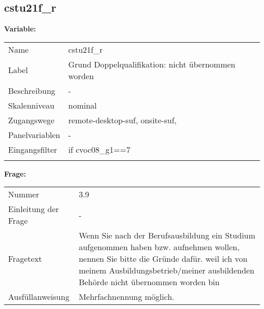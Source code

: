 	
	
	\subsection{cstu21f\_r}
	\label{subSection:cstu21f_r}

	\noindent\textbf{Variable:}\\
		\begin{tabular}{lL{11.3cm}}
			\label{tableVariable:cstu21f_r}
			Name & cstu21f\_r \\
			Label & Grund Doppelqualifikation: nicht übernommen worden \\
			Beschreibung & - \\
			Skalenniveau & nominal \\
			Zugangswege &
				remote-desktop-suf,
				onsite-suf,
 \\
			Panelvariablen & -
			 \\
			Eingangsfilter & if cvoc08\_g1==7 \\
 \\
		\end{tabular}

		\vspace*{1 cm}
		\noindent\textbf{Frage:}\\
		\begin{tabular}{lL{11.3cm}}
			\label{tableQuestion:cstu21f_r}
			Nummer & 3.9 \\
			Einleitung der Frage & - \\
			Fragetext & Wenn Sie nach der Berufsausbildung ein Studium aufgenommen haben bzw. aufnehmen wollen, nennen Sie bitte die Gründe dafür. 
weil ich von meinem Ausbildungsbetrieb/meiner ausbildenden Behörde nicht übernommen worden bin \\
			Ausfüllanweisung & Mehrfachnennung möglich. \\
		\end{tabular}





